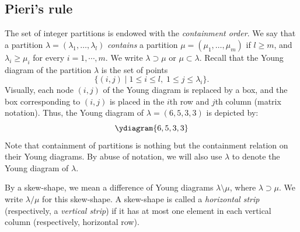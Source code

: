 \documentclass[11pt]{amsart}
\theoremstyle{definition}
\theoremstyle{example}
\begin{document}
\subsection{Pieri's rule}
\label{sec:pieri}
The set of integer partitions is endowed with the \emph{containment order}.
We say that a partition $\lambda=(\lambda_1,\dotsc,\lambda_l)$ \emph{contains} a partition $\mu=(\mu_1,\dotsc, \mu_m)$ if $l \geq m$, and $\lambda_i\geq \mu_i$ for every $i=1,\dotsb, m$.
We write $\lambda\supset\mu$ or $\mu \subset \lambda$.
Recall that the Young diagram of the partition $\lambda$ is the set of points 
\begin{displaymath}
\{(i, j)\mid 1\leq i\leq l,\; 1\leq j\leq \lambda_i\}.
\end{displaymath}
Visually, each node $(i,j)$ of the Young diagram is replaced by a box, and the box corresponding to $(i,j)$ is placed in the $i$th row and $j$th column (matrix notation).
Thus, the Young diagram of $\lambda=(6, 5, 3, 3)$ is depicted by:
\begin{displaymath}
  \ydiagram{6,5,3,3}
\end{displaymath}
Note that containment of partitions is nothing but the containment relation on their Young diagrams.
By abuse of notation, we will also use $\lambda$ to denote the Young diagram of $\lambda$.

By a skew-shape, we mean a difference of Young diagrams $\lambda \setminus \mu$, where $\lambda \supset \mu$.
We write $\lambda/\mu$ for this skew-shape.
A skew-shape is called a \emph{horizontal strip} (respectively, a \emph{vertical strip}) if it has at most one element in each vertical column (respectively, horizontal row).
\end{document}
